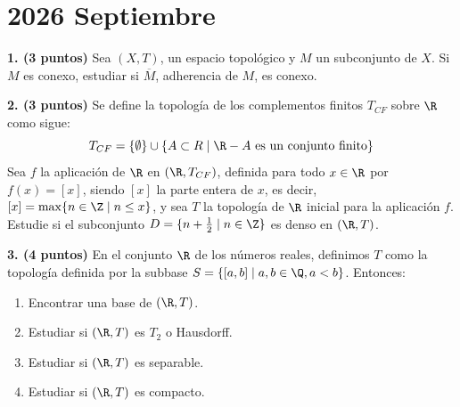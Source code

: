 \clearpage
\chapter*{2026 Septiembre}

\begin{enunciado}
    \hypertarget{2026 S 1}{}
    \textbf{1. (3 puntos)} Sea \((X, T)\), un espacio topológico y \(M\) un subconjunto de \(X\). Si \(M\) es conexo, estudiar si \(\overline{M}\), adherencia de \(M\), es conexo.
\end{enunciado}

\begin{enunciado}
    \hypertarget{2026 S 2}{}
    \textbf{2. (3 puntos)} Se define la topología de los complementos finitos \(T_{CF}\) sobre \(\R\) como sigue: 
    \[
    T_{CF}=\{\emptyset\}\cup\{A\subset R \mid \R-A \text{ es un conjunto finito}\}
    \]
    Sea \(f\) la aplicación de \(\R\) en \((\R,T_{CF})\), definida para todo \(x \in \R\) por \(f(x) = [x]\), siendo \([x]\) la parte entera de \(x\), es decir, \([x] = \max\{n \in \Z \mid n \leq x\}\), y sea \(T\) la topología de \(\R\) inicial para la aplicación \(f\). Estudie si el subconjunto \(D = \{n + \frac{1}{2} \mid n \in \Z\}\) es denso en \((\R,T)\).
\end{enunciado}

\begin{enunciado}
    \hypertarget{2026 S 3}{}
    \textbf{3. (4 puntos)} En el conjunto \(\R\) de los números reales, definimos \(T\) como la topología definida por la subbase \(S = \{[a,b] \mid a, b \in \Q, a < b\}\). Entonces:
    \begin{enumerate}[label=\alph*)]
        \item Encontrar una base de \((\R,T)\).
        \item Estudiar si \((\R,T)\) es \(T_2\) o Hausdorff.
        \item Estudiar si \((\R,T)\) es separable.
        \item Estudiar si \((\R,T)\) es compacto.
    \end{enumerate}
\end{enunciado}